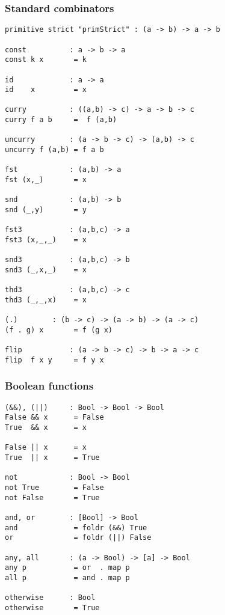 \subsubsection*{Standard combinators}
\begin{verbatim}
primitive strict "primStrict" : (a -> b) -> a -> b

const          : a -> b -> a
const k x       = k

id             : a -> a
id    x         = x

curry          : ((a,b) -> c) -> a -> b -> c
curry f a b     =  f (a,b)

uncurry        : (a -> b -> c) -> (a,b) -> c
uncurry f (a,b) = f a b

fst            : (a,b) -> a
fst (x,_)       = x

snd            : (a,b) -> b
snd (_,y)       = y

fst3           : (a,b,c) -> a
fst3 (x,_,_)    = x

snd3           : (a,b,c) -> b
snd3 (_,x,_)    = x

thd3           : (a,b,c) -> c
thd3 (_,_,x)    = x

(.)	       : (b -> c) -> (a -> b) -> (a -> c)
(f . g) x       = f (g x)

flip           : (a -> b -> c) -> b -> a -> c
flip  f x y     = f y x
\end{verbatim}
\subsubsection*{Boolean functions}
\begin{verbatim}
(&&), (||)     : Bool -> Bool -> Bool
False && x      = False
True  && x      = x

False || x      = x
True  || x      = True

not            : Bool -> Bool
not True        = False
not False       = True

and, or        : [Bool] -> Bool
and             = foldr (&&) True
or              = foldr (||) False

any, all       : (a -> Bool) -> [a] -> Bool
any p           = or  . map p
all p           = and . map p

otherwise      : Bool
otherwise       = True
\end{verbatim}

